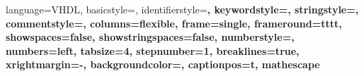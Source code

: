 \newcommand{\etal}[0]{\textit{et~al.}\xspace}
\newcommand{\fixme}[1]{\textcolor{magenta}{#1}\xspace}
\newcommand{\HAL}[0]{\textnormal{\texttt{HAL}}\xspace}
\newcommand{\romannumber}[1]{\uppercase\expandafter{\romannumeral#1}}
\newcommand{\todo}[1]{\textcolor{red}{todo: #1}\xspace}


\newcommand{\Algorithm}[1]{\textcolor{blue}{Algorithm~\ref{#1}}}
\newcommand{\Appendix}[1]{\textcolor{blue}{Appendix~\ref{#1}}}
\newcommand{\Chapter}[1]{\textcolor{blue}{Chapter~\ref{#1}}}
\newcommand{\Definition}[1]{\textcolor{blue}{Definition~\ref{#1}}}
\newcommand{\Equation}[1]{\textcolor{blue}{Equation~\ref{#1}}}
\newcommand{\Figure}[1]{\textcolor{blue}{Figure~\ref{#1}}}
\newcommand{\Listing}[1]{\textcolor{blue}{Listing~\ref{#1}}}
\newcommand{\Section}[1]{\textcolor{blue}{Section~\ref{#1}}}
\newcommand{\Table}[1]{\textcolor{blue}{Table\ref{#1}}}



{
	language=VHDL,
	basicstyle=\ttfamily\footnotesize,
	identifierstyle=\bfseries\color{black},
	keywordstyle=\bfseries\color{blue!80},
	stringstyle=\bfseries\color{black!50},
	commentstyle=\bfseries\color{green!80},
	columns=flexible,
	frame=single,
	frameround=tttt,
	showspaces=false,
	showstringspaces=false,
	numberstyle=\tiny,
	numbers=left,
	tabsize=4,
	stepnumber=1,
	breaklines=true,
	xrightmargin=-\fboxsep,
	backgroundcolor=\color{white},
	captionpos=t,
	mathescape
}
